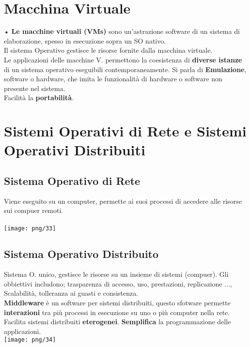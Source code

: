 \documentclass[12pt, letterpaper]{article}
\begin{document}
\section{Macchina Virtuale}

• \textbf{Le macchine virtuali (VMs)} sono un'astrazione software di un sistema di elaborazione, spesso in esecuzione sopra un SO nativo.
\\
Il sistema Operativo gestisce le risorse fornite dalla macchina virtuale.\\
Le applicazioni delle macchine V. permettono la coesistenza di \textbf{diverse istanze} di un sistema operativo eseguibili 
contemporaneamente. Si parla di \textbf{Emulazione}, software o hardware, che imita le funzionalità di hardware o software non presente nel sistema.
\\
Facilità la \textbf{portabilità}.

\section{Sistemi Operativi di Rete e Sistemi Operativi Distribuiti}

\subsection{Sistema Operativo di Rete}

Viene eseguito su un computer, permette ai suoi processi di accedere alle risorse sui compuer remoti.
\\
\\
\texttt{[image: png/33]}

\subsection{Sistema Operativo Distribuito}

Sistema O. unico, gestisce le risorse su un insieme di sistemi (compuer). Gli obbiettivi includono; trasparenza di accesso, uso, prestazioni, replicazione ..., Scalabilità, tolleranza ai guasti e consistenza.\\
\textbf{Middleware} è un software per sistemi distribuiti, questo sfotware permette \textbf{interazioni} tra più processi in esecuzione su uno o più computer nella rete. Facilita sistemi distribuiti \textbf{eterogenei}. \textbf{Semplifica} la programmazione delle applicazioni.
\\
\texttt{[image: png/34]}
\end{document}
